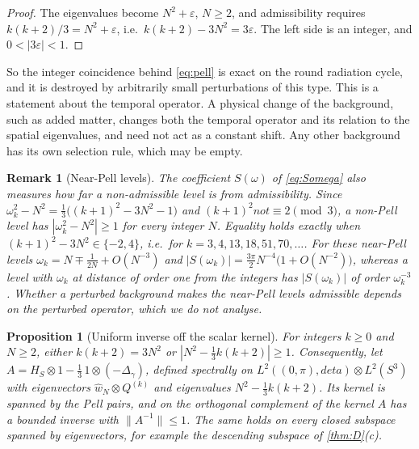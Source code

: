 \documentclass[11pt]{article}
\theoremstyle{canonmath}
\newtheorem{remark}[theorem]{Remark}
\theoremstyle{canonpostulate}
\theoremstyle{canonproposition}
\theoremstyle{canonmath}
\newtheorem{proposition*}[theorem]{Proposition}
\theoremstyle{canonproposition}
\def\mathcal#1{#1}%
\def\eta{eta}%
\def\not{not}%
\begin{document}
\begin{proof}
The eigenvalues become $N^2+\varepsilon$, $N\ge2$, and admissibility requires $k(k+2)/3 = N^2+\varepsilon$, i.e.\ $k(k+2)-3N^2 = 3\varepsilon$. The left side is an integer, and $0<|3\varepsilon|<1$.
\end{proof}

So the integer coincidence behind \eqref{eq:pell} is exact on the round radiation cycle, and it is destroyed by arbitrarily small perturbations of this type. This is a statement about the temporal operator. A physical change of the background, such as added matter, changes both the temporal operator and its relation to the spatial eigenvalues, and need not act as a constant shift. Any other background has its own selection rule, which may be empty.

\begin{remark}[Near-Pell levels]\label{rem:nearpell}
The coefficient $S(\omega)$ of \eqref{eq:Somega} also measures how far a non-admissible level is from admissibility. Since $\omega_k^2 - N^2 = \tfrac13\bigl((k+1)^2-3N^2-1\bigr)$ and $(k+1)^2\not\equiv2\pmod3$, a non-Pell level has $|\omega_k^2 - N^2|\ge1$ for every integer $N$. Equality holds exactly when $(k+1)^2-3N^2\in\{-2,4\}$, i.e.\ for $k = 3,4,13,18,51,70,\dots$. For these near-Pell levels $\omega_k = N\mp\tfrac1{2N} + O(N^{-3})$ and $|S(\omega_k)| = \tfrac{3\pi}{2}N^{-4}\bigl(1+O(N^{-2})\bigr)$, whereas a level with $\omega_k$ at distance of order one from the integers has $|S(\omega_k)|$ of order $\omega_k^{-3}$. Whether a perturbed background makes the near-Pell levels admissible depends on the perturbed operator, which we do not analyse.
\end{remark}

\begin{proposition*}[Uniform inverse off the scalar kernel]\label{prop:gap}
For integers $k\ge0$ and $N\ge2$, either $k(k+2) = 3N^2$ or $|N^2 - \tfrac13k(k+2)|\ge1$. Consequently, let $\mathcal A = \mathcal H_S\otimes1 - \tfrac13\,1\otimes(-\Delta_\gamma)$, defined spectrally on $L^2((0,\pi),d\eta)\otimes L^2(S^3)$ with eigenvectors $\hat w_N\otimes Q^{(k)}$ and eigenvalues $N^2 - \tfrac13k(k+2)$. Its kernel is spanned by the Pell pairs, and on the orthogonal complement of the kernel $\mathcal A$ has a bounded inverse with $\|\mathcal A^{-1}\|\le1$. The same holds on every closed subspace spanned by eigenvectors, for example the descending subspace of \cref{thm:D}(c).
\end{proposition*}
\end{document}
